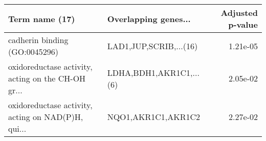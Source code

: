 \begin{tabular}{llr}
\toprule
                                    Term name (17) &    Overlapping genes... &  Adjusted p-value \\
\midrule
                     cadherin binding (GO:0045296) &  LAD1,JUP,SCRIB,...(16) &          1.21e-05 \\
oxidoreductase activity, acting on the CH-OH gr... & LDHA,BDH1,AKR1C1,...(6) &          2.05e-02 \\
oxidoreductase activity, acting on NAD(P)H, qui... &      NQO1,AKR1C1,AKR1C2 &          2.27e-02 \\
\bottomrule
\end{tabular}
